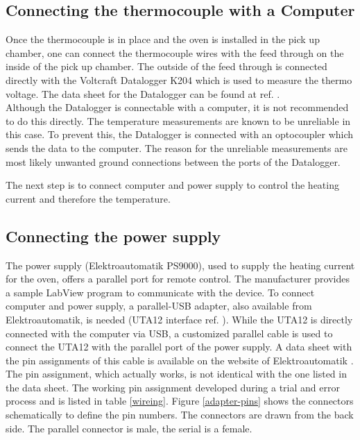 \documentclass[parskip,12pt,headsepline,a4paper] {scrbook}
\begin{document}
\subsection{Connecting the thermocouple with a Computer}
\vspace{-1\baselineskip}
Once the thermocouple is in place and the oven is installed in the pick up chamber, one can connect the thermocouple wires with the feed through on the inside of the pick up chamber. The outside of the feed through is connected directly with the Voltcraft Datalogger K204 which is used to measure the thermo voltage. The data sheet for the Datalogger can be found at ref. \cite{ref-datalogger}. \\
Although the Datalogger is connectable with a computer, it is not recommended to do this directly. The temperature measurements are known to be unreliable in this case. To prevent this, the Datalogger is connected with an optocoupler which sends the data to the computer. The reason for the unreliable measurements are most likely unwanted ground connections between the ports of the Datalogger.

The next step is to connect computer and power supply to control the heating current and therefore the temperature.

\subsection{Connecting the power supply}
\vspace{-1\baselineskip}
The power supply (Elektroautomatik PS9000), used to supply the heating current for the oven, offers a parallel port for remote control. The manufacturer provides a sample LabView program to communicate with the device. To connect computer and power supply, a parallel-USB adapter, also available from Elektroautomatik, is needed (UTA12 interface ref. \cite{ref-uta12}). While the UTA12 is directly connected with the computer via USB, a customized parallel cable is used to connect the UTA12 with the parallel port of the power supply. A data sheet with the pin assignments of this cable is available on the website of Elektroautomatik \cite{ref-uta12}. The pin assignment, which actually works, is not identical with the one listed in the data sheet. The working pin assignment developed during a trial and error process and is listed in table \ref{wireing}. Figure \ref{adapter-pins} shows the connectors schematically to define the pin numbers. The connectors are drawn from the back side. The parallel connector is male, the serial is a female.
\end{document}
